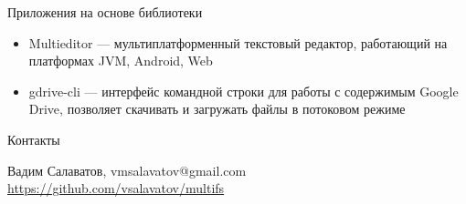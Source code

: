 \documentclass[14pt,aspectratio=169,hyperref={pdftex,unicode},xcolor=dvipsnames]{beamer}
\begin{document}
\begin{frame}{Приложения на основе библиотеки}
\begin{itemize}
  \item Multieditor --- мультиплатформенный текстовый редактор, работающий на платформах JVM, Android, Web
  \item gdrive-cli --- интерфейс командной строки для работы с содержимым Google Drive, позволяет скачивать и загружать файлы в потоковом режиме
\end{itemize}
\end{frame}

\begin{frame}{Контакты}
  
  \begin{center}
  Вадим Салаватов, vmsalavatov@gmail.com\\ 
  \url{https://github.com/vsalavatov/multifs} \hspace{0.44em}
  \end{center}
\end{frame}
  


%
%
\end{document}
